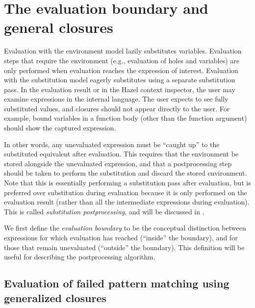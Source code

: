 \section{The evaluation boundary and general closures}
\label{sec:generalized-closures-eval-boundary}

Evaluation with the environment model lazily substitutes variables. Evaluation steps that require the environment (e.g., evaluation of holes and variables) are only performed when evaluation reaches the expression of interest. Evaluation with the substitution model eagerly substitutes using a separate substitution pass. In the evaluation result or in the Hazel context inspector, the user may examine expressions in the internal language. The user expects to see fully substituted values, and closures should not appear directly to the user. For example, bound variables in a function body (other than the function argument) should show the captured expression.

In other words, any unevaluated expression must be ``caught up'' to the substituted equivalent after evaluation. This requires that the environment be stored alongside the unevaluated expression, and that a postprocessing step should be taken to perform the substitution and discard the stored environment. Note that this is essentially performing a substitution pass after evaluation, but is preferred over substitution during evaluation because it is only performed on the evaluation result (rather than all the intermediate expressions during evaluation). This is called \textit{substitution postprocessing}, and will be discussed in .

We first define the \textit{evaluation boundary} to be the conceptual distinction between expressions for which evaluation has reached (``inside'' the boundary), and for those that remain unevaluated (``outside'' the boundary). This definition will be useful for describing the postprocessing algorithm.

\subsection{Evaluation of failed pattern matching using generalized closures}
\label{sec:failed_pattern_match}

